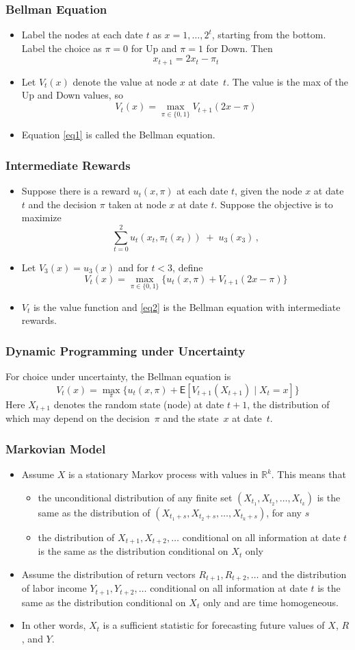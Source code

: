\documentclass[10pt]{beamer}
\newcommand{\bi}{\begin{itemize}}
\newcommand{\ei}{\end{itemize}}
\newcommand{\im}{\item}
\newcommand{\mye}{\ensuremath{\mathsf{E}}}
\newcommand{\myreal}{\ensuremath{\mathbb{R}}}
\newcommand{\bq}{\begin{equation}}
\newcommand{\eq}{\end{equation}}
\newcommand{\bfr}{\begin{frame}}
\begin{document}
\bfr\frametitle{Bellman Equation}
\bi
\im Label the nodes at each date $t$ as $x=1,\ldots,2^t$, starting from the bottom.  Label the choice as $\pi=0$ for Up and $\pi=1$ for Down.  Then
$$x_{t+1} = 2x_t - \pi_t$$
\im Let $V_t(x)$ denote the value at node $x$ at date~$t$.  The value is the max of the Up and Down values, so
\bq\tag{$\star$}\label{eq1}
V_{t}(x) = \max_{\pi\in\{0,1\}} V_{t+1}(2x-\pi)
\eq
\im Equation \eqref{eq1} is called the Bellman equation.
\ei

\end{frame}

\bfr\frametitle{Intermediate Rewards}
\bi
\im Suppose there is a reward $u_t(x,\pi)$ at each date $t$, given the node $x$ at date $t$ and the decision $\pi$ taken at node $x$ at date $t$.  Suppose the objective is to maximize
$$\sum_{t=0}^2 u_{t}(x_t,\pi_{t}(x_t)) \;+\; u_3(x_3)\,,$$
\im 
Let $V_3(x) = u_3(x)$ and for $t<3$, define
\bq\label{eq2}\tag{$\star\star$}
V_{t}(x) = \max_{\pi\in\{0,1\}} \bigg\{u_{t}(x,\pi) + V_{t+1}(2x-\pi)\bigg\} 
\eq
\im $V_t$ is the value function and \eqref{eq2} is the Bellman equation with intermediate rewards.
\ei
\end{frame}

\bfr\frametitle{Dynamic Programming under Uncertainty}
For choice under uncertainty, the Bellman equation is
\bq\label{eq3}\tag{$\star\star\star$}
V_{t}( x) = \max_{\pi} \bigg\{u_{t}(x,\pi) + \mye[V_{t+1}(X_{t+1})\mid X_t=x]\bigg\}
\eq
Here $X_{t+1}$ denotes the random state (node) at date $t\!+\!1$, the distribution of which may depend on the decision~$\pi$ and the state~$x$ at date~$t$.  
\end{frame}

\bfr\frametitle{Markovian Model}
\bi
\im Assume $X$ is a stationary Markov process with values in $\myreal^k$.  This means that
\bi
\im the unconditional distribution of any finite set $(X_{t_1},X_{t_2},\ldots,X_{t_k})$ is the same as the distribution of $(X_{t_1+s},X_{t_2+s},\ldots,X_{t_k+s})$, for any $s$
\im the distribution of $X_{t+1}, X_{t+2}, \ldots$ conditional on all information at date $t$ is the same as the distribution conditional on $X_t$ only 
\ei
\im Assume the distribution of return vectors $R_{t+1}, R_{t+2}, \ldots$ and the distribution of labor income $Y_{t+1}, Y_{t+2}, \ldots$ conditional on all information at date $t$ is the same as the distribution conditional on $X_t$ only and are time homogeneous.
\im In other words, $X_t$ is a sufficient statistic for forecasting future values of $X$, $R$, and $Y$.
\ei
\end{frame}
\end{document}
